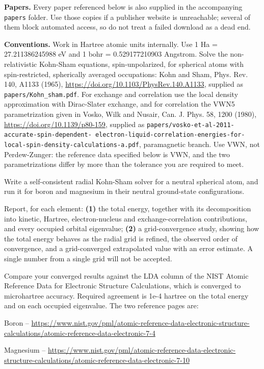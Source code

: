 \textbf{Papers.} Every paper referenced below is also supplied in the accompanying \texttt{papers} folder. Use
those copies if a publisher website is unreachable; several of them block automated access, so do not treat a
failed download as a dead end.

\textbf{Conventions.} Work in Hartree atomic units internally. Use 1 Ha = 27.211386245988 eV and
1 bohr = 0.529177210903 Angstrom. Solve the non-relativistic Kohn-Sham equations, spin-unpolarized, for spherical atoms with
spin-restricted, spherically averaged occupations: Kohn and Sham, Phys. Rev. 140, A1133 (1965),
\url{https://doi.org/10.1103/PhysRev.140.A1133}, supplied as \texttt{papers/Kohn\_sham.pdf}. For exchange and
correlation use the local density approximation with Dirac-Slater exchange, and for correlation the VWN5
parametrization given in Vosko, Wilk and Nusair, Can. J. Phys. 58, 1200 (1980),
\url{https://doi.org/10.1139/p80-159}, supplied as \texttt{papers/vosko-et-al-2011-accurate-spin-dependent-
electron-liquid-correlation-energies-for-local-spin-density-calculations-a.pdf}, paramagnetic branch. Use VWN,
not Perdew-Zunger: the reference data specified below is VWN, and the two parametrizations differ by more than
the tolerance you are required to meet.


Write a self-consistent radial Kohn-Sham solver for a neutral spherical atom, and run it for boron and
magnesium in their neutral ground-state configurations.

Report, for each element: \textbf{(1)} the total energy, together with its decomposition into kinetic,
Hartree, electron-nucleus and exchange-correlation contributions, and every occupied orbital eigenvalue;
\textbf{(2)} a grid-convergence study, showing how the total energy behaves as the radial grid is refined,
the observed order of convergence, and a grid-converged extrapolated value with an error estimate. A single
number from a single grid will not be accepted.

Compare your converged results against the LDA column of the NIST Atomic Reference Data for Electronic
Structure Calculations, which is converged to microhartree accuracy. Required agreement is 1e-4 hartree on
the total energy and on each occupied eigenvalue. The two reference pages are:

\begin{urlblock}
\item Boron --
\url{https://www.nist.gov/pml/atomic-reference-data-electronic-structure-calculations/atomic-reference-data-electronic-7-4}
\item Magnesium --
\url{https://www.nist.gov/pml/atomic-reference-data-electronic-structure-calculations/atomic-reference-data-electronic-7-10}
\end{urlblock}

